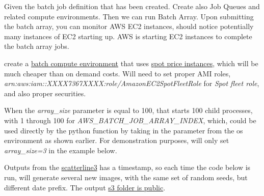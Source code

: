\documentclass[
]{book}
\begin{document}
Given the batch job definition that has been created. Create also Job Queues and related compute environments. Then we can run Batch Array. Upon submitting the batch array, you can monitor AWS EC2 instances, should notice potentially many instances of EC2 starting up. AWS is starting EC2 instances to complete the batch array jobs.

create a \href{https://docs.aws.amazon.com/batch/latest/userguide/compute_environments.html}{batch compute environment} that uses \href{https://aws.amazon.com/ec2/pricing/}{spot price instances}, which will be much cheaper than on demand costs. Will need to set proper AMI roles, \emph{arn:aws:iam::XXXX7367XXXX:role/AmazonEC2SpotFleetRole} for \emph{Spot fleet role}, and also proper securities.

When the \emph{array\_size} parameter is equal to 100, that starts 100 child processes, with 1 through 100 for \emph{AWS\_BATCH\_JOB\_ARRAY\_INDEX}, which, could be used directly by the python function by taking in the parameter from the os environment as shown earlier. For demonstration purposes, will only set \emph{array\_size=3} in the example below.

Outputs from the \href{https://github.com/FanWangEcon/pyfan/blob/master/pyfan/graph/exa/scatterline3.py\#L138}{scatterline3} has a timestamp, so each time the code below is run, will generate several new images, with the same set of random seeds, but different date prefix. The output \href{https://s3.console.aws.amazon.com/s3/buckets/fans3testbucket/pyfan_gph_scatter_line_rand/?region=us-east-1\&tab=overview}{s3 folder is public}.
\end{document}
